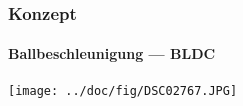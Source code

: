 \begin{frame}
    \frametitle{Konzept}
    \framesubtitle{Ballbeschleunigung --- BLDC}
    \begin{center}
        \texttt{[image: ../doc/fig/DSC02767.JPG]}
    \end{center}
\end{frame}


